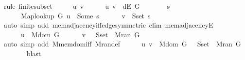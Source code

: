 \begin{isabellebody}
%
\isadelimproof
%
\endisadelimproof
%
\isatagproof
{}\isamarkupfalse%
\ {\isacharparenleft}{\kern0pt}rule\ finite{\isacharunderscore}{\kern0pt}subset{\isacharparenright}{\kern0pt}\isanewline
\ \ \isacommand{{\isacharbraceleft}{\kern0pt}}\isamarkupfalse%
\ \isamarkupfalse%
\ u\ v\isanewline
\ \ \ \ \isamarkupfalse%
\ {\isachardoublequoteopen}{\isacharparenleft}{\kern0pt}u{\isacharcomma}{\kern0pt}\ v{\isacharparenright}{\kern0pt}\ {\isasymin}\ dE\ G{\isachardoublequoteclose}\isanewline
\ \ \ \ \isamarkupfalse%
\ \isamarkupfalse%
\ s\ \isanewline
\ \ \ \ \ \ {\isachardoublequoteopen}Map{\isacharunderscore}{\kern0pt}lookup\ G\ u\ {\isacharequal}{\kern0pt}\ Some\ s{\isachardoublequoteclose}\isanewline
\ \ \ \ \ \ {\isachardoublequoteopen}v\ {\isasymin}\ S{\isachardot}{\kern0pt}set\ s{\isachardoublequoteclose}\isanewline
\ \ \ \ \ \ \isamarkupfalse%
\ {\isacharparenleft}{\kern0pt}auto\ simp\ add{\isacharcolon}{\kern0pt}\ mem{\isacharunderscore}{\kern0pt}adjacency{\isacharunderscore}{\kern0pt}iff{\isacharunderscore}{\kern0pt}edge{\isacharbrackleft}{\kern0pt}symmetric{\isacharbrackright}{\kern0pt}\ elim{\isacharcolon}{\kern0pt}\ mem{\isacharunderscore}{\kern0pt}adjacencyE{\isacharparenright}{\kern0pt}\isanewline
\ \ \ \ \isamarkupfalse%
\isanewline
\ \ \ \ \ \ {\isachardoublequoteopen}u\ {\isasymin}\ M{\isachardot}{\kern0pt}dom\ G{\isachardoublequoteclose}\isanewline
\ \ \ \ \ \ {\isachardoublequoteopen}v\ {\isasymin}\ {\isasymUnion}\ {\isacharparenleft}{\kern0pt}S{\isachardot}{\kern0pt}set\ {\isacharbackquote}{\kern0pt}\ M{\isachardot}{\kern0pt}ran\ G{\isacharparenright}{\kern0pt}{\isachardoublequoteclose}\isanewline
\ \ \ \ \ \ \isamarkupfalse%
\ {\isacharparenleft}{\kern0pt}auto\ simp\ add{\isacharcolon}{\kern0pt}\ M{\isachardot}{\kern0pt}mem{\isacharunderscore}{\kern0pt}dom{\isacharunderscore}{\kern0pt}iff\ M{\isachardot}{\kern0pt}ran{\isacharunderscore}{\kern0pt}def{\isacharparenright}{\kern0pt}\isanewline
\ \ \ \ \isamarkupfalse%
\ {\isachardoublequoteopen}{\isacharparenleft}{\kern0pt}u{\isacharcomma}{\kern0pt}\ v{\isacharparenright}{\kern0pt}\ {\isasymin}\ M{\isachardot}{\kern0pt}dom\ G\ {\isasymtimes}\ {\isasymUnion}\ {\isacharparenleft}{\kern0pt}S{\isachardot}{\kern0pt}set\ {\isacharbackquote}{\kern0pt}\ M{\isachardot}{\kern0pt}ran\ G{\isacharparenright}{\kern0pt}{\isachardoublequoteclose}\isanewline
\ \ \ \ \ \ \isamarkupfalse%
\ blast\ \isacommand{{\isacharbraceright}{\kern0pt}}\isamarkupfalse%

\end{isabellebody}
